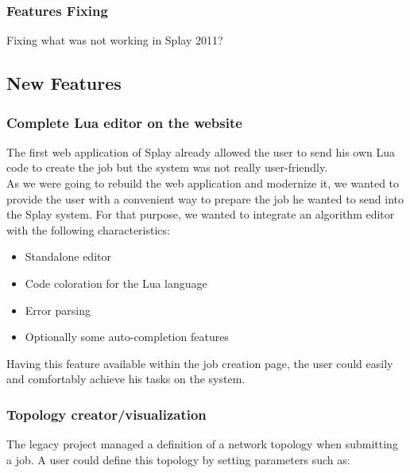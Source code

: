 \documentclass{eplmastersthesis}
\begin{document}
        \subsubsection{Features Fixing} %

          Fixing what was not working in Splay 2011?

      \subsection{New Features}

        \subsubsection{Complete Lua editor on the website}

          The first web application of Splay already allowed the user to send
          his own Lua code to create the job but the system was not really
          user-friendly.\\

          As we were going to rebuild the web application and modernize it,
          we wanted to provide the user with a convenient way to prepare
          the job he wanted to send into the Splay system. For that purpose,
          we wanted to integrate an algorithm editor with the following
          characteristics:

          \begin{itemize}
            \item Standalone editor
            \item Code coloration for the Lua language
            \item Error parsing
            \item Optionally some auto-completion features
          \end{itemize}

          Having this feature available within the job creation page, the user
          could easily and comfortably achieve his tasks on the system.

        \subsubsection{Topology creator/visualization}

          The legacy project managed a definition of a network topology when
          submitting a job. A user could define this topology by setting
          parameters such as:
\end{document}
